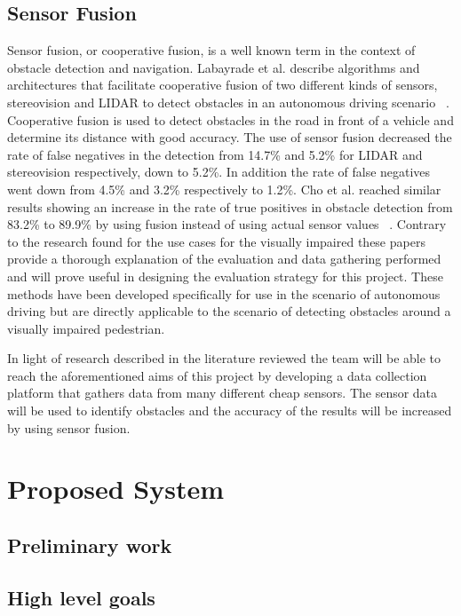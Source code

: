 \documentclass[prodmode,acmtecs]{acmsmall} %
\begin{document}
\subsection{Sensor Fusion}
Sensor fusion, or cooperative fusion, is a well known term in the context of obstacle detection and navigation. Labayrade et al. describe algorithms and architectures that facilitate cooperative fusion of two different kinds of sensors, stereovision and LIDAR to detect obstacles in an autonomous driving scenario ~\cite{Labayrade2005}. Cooperative fusion is used to detect obstacles in the road in front of a vehicle and determine its distance with good accuracy. The use of sensor fusion decreased the rate of false negatives in the detection from 14.7\% and 5.2\% for LIDAR and stereovision respectively, down to 5.2\%. In addition the rate of false negatives went down from 4.5\% and 3.2\% respectively to 1.2\%. Cho et al. reached similar results showing an increase in the rate of true positives in obstacle detection from 83.2\% to 89.9\% by using fusion instead of using actual sensor values ~\cite{Cho2014}. Contrary to the research found for the use cases for the visually impaired these papers provide a thorough explanation of the evaluation and data gathering performed and will prove useful in designing the evaluation strategy for this project. These methods have been developed specifically for use in the scenario of autonomous driving but are directly applicable to the scenario of detecting obstacles around a visually impaired pedestrian.

In light of research described in the literature reviewed the team will be able to reach the aforementioned aims of this project by developing a data collection platform that gathers data from many different cheap sensors. The sensor data will be used to identify obstacles and the accuracy of the results will be increased by using sensor fusion.

\section{Proposed System}
\subsection{Preliminary work}


\subsection{High level goals}
\end{document}
